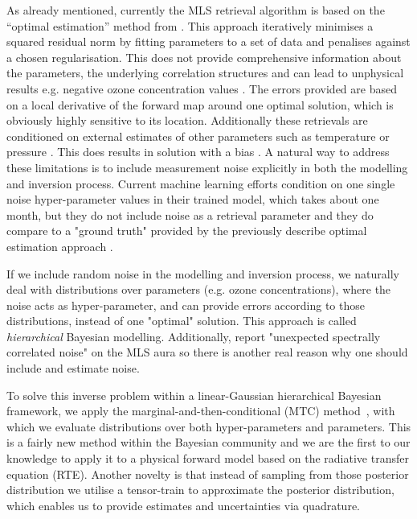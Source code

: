 As already mentioned, currently the MLS retrieval algorithm \cite{livesey2006retrieval} is based on the “optimal estimation” method from \cite{rodgers1976retrieval}.
This approach iteratively minimises a squared residual norm by fitting parameters to a set of data and penalises against a chosen regularisation.
This does not provide comprehensive information about the parameters, the underlying correlation structures and can lead to unphysical results e.g. negative ozone concentration values \cite{MLSdata}.
The errors provided are based on a local derivative of the forward map around one optimal solution, which is obviously highly sensitive to its location.
Additionally these retrievals are conditioned on external estimates of other parameters such as temperature or pressure \cite{livesey2006retrieval}.
This does results in solution with a bias \cite{} .
A natural way to address these limitations is to include measurement noise explicitly in both the modelling and inversion process.
Current machine learning efforts condition on one single noise hyper-parameter values in their trained model, which takes about one month, but they do not include noise as a retrieval parameter and they do compare to a "ground truth" provided by the previously describe optimal estimation approach \cite{werner2023machlearn, bojkov2008NeuralNet}.

If we include random noise in the modelling and inversion process, we naturally deal with distributions over parameters (e.g. ozone concentrations), where the noise acts as hyper-parameter, and can provide errors according to those distributions, instead of one "optimal" solution.
This approach is called \textit{hierarchical} Bayesian modelling.
Additionally, \cite{livesey2006retrieval} report "unexpected spectrally correlated noise" on the MLS aura so there is another real reason why one should include and estimate noise.

To solve this inverse problem within a linear-Gaussian hierarchical Bayesian framework, we apply the marginal-and-then-conditional (MTC) method~\cite{fox2016fast}, with which we evaluate distributions over both hyper-parameters and parameters.
This is a fairly new method within the Bayesian community and we are the first to our knowledge to apply it to a physical forward model based on the radiative transfer equation (RTE).
Another novelty is that instead of sampling from those posterior distribution we utilise a tensor-train to approximate the posterior distribution, which enables us to provide estimates and uncertainties via quadrature.

